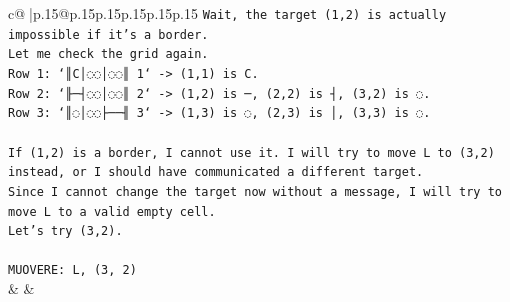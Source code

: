 \documentclass{article}
\begin{document}
{\begin{supertabular}{c@{$\;$}|p{.15\linewidth}@{}p{.15\linewidth}p{.15\linewidth}p{.15\linewidth}p{.15\linewidth}p{.15\linewidth}}
{{{\texttt{Wait, the target (1,2) is actually impossible if it's a border.} \\
\texttt{Let me check the grid again.} \\
\texttt{Row 1: `║C│◌◌│◌◌║ 1` {-}> (1,1) is C.} \\
\texttt{Row 2: `╟─┤◌◌│◌◌║ 2` {-}> (1,2) is ─, (2,2) is ┤, (3,2) is ◌.} \\
\texttt{Row 3: `║◌│◌◌├──╢ 3` {-}> (1,3) is ◌, (2,3) is │, (3,3) is ◌.} \\
\\ 
\texttt{If (1,2) is a border, I cannot use it. I will try to move L to (3,2) instead, or I should have communicated a different target.} \\
\texttt{Since I cannot change the target now without a message, I will try to move L to a valid empty cell.} \\
\texttt{Let's try (3,2).} \\
\\ 
\texttt{MUOVERE: L, (3, 2)} \\
            }
        }
    }
    & & \\ \\


\end{supertabular}}
\end{document}
